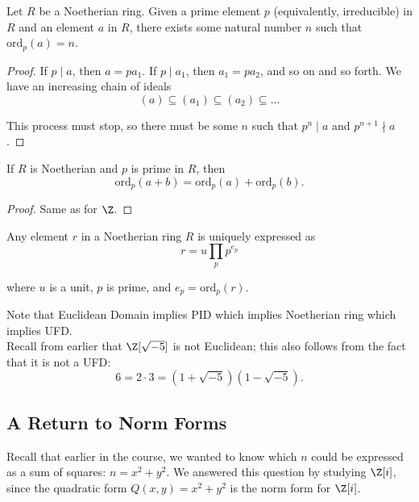 \documentclass[11pt]{article}
\begin{document}
\begin{lemma}
Let $R$ be a Noetherian ring. Given a prime element $p$ (equivalently, irreducible) in $R$ and an element $a$ in $R$, there exists some natural number $n$ such that 
$\mathrm{ord}_p(a) = n$. 
\end{lemma}

\begin{proof}
If $p \mid a$, then $a = pa_1$. If $p \mid a_1$, then $a_1 = pa_2$, and so on and so forth. We have an increasing chain of ideals
\[
    (a) \subseteq (a_1) \subseteq (a_2) \subseteq \dots
\]    

This process must stop, so there must be some $n$ such that $p^n \mid a$ and $p^{n+1} \nmid a$.
\end{proof}

\begin{lemma}
If $R$ is Noetherian and $p$ is prime in $R$, then 
\[
    \mathrm{ord}_p(a+b) = \mathrm{ord}_p(a) + \mathrm{ord}_p(b).   
\]
\end{lemma}

\begin{proof}
Same as for $\Z$.
\end{proof}


\begin{theorem}
Any element $r$ in a Noetherian ring $R$ is uniquely expressed as 
\[
    r = u \prod_p p^{e_{p}}
\]

where $u$ is a unit, $p$ is prime, and $e_p = \mathrm{ord}_p(r).$ 
\end{theorem}

\begin{remark}
Note that Euclidean Domain implies PID which implies Noetherian ring which implies UFD. \\

Recall from earlier that $\Z[\sqrt{-5}]$ is not Euclidean; this also follows from the fact that it is not a UFD: 
\[
    6 = 2 \cdot 3 = (1+\sqrt{-5})(1-\sqrt{-5}).
\]
\end{remark}

\subsection{A Return to Norm Forms}

Recall that earlier in the course, we wanted to know which $n$ could be expressed as a sum of squares: $n = x^2 + y^2$.
We answered this question by studying $\Z[i]$, since the quadratic form $Q(x, y) = x^2 + y^2$ is the norm form for $\Z[i]$. \\
\end{document}
